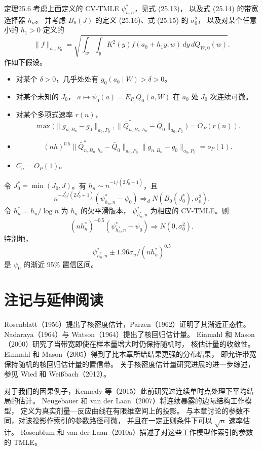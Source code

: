 \begin{bookresult}{定理}{25.6}
考虑上面定义的 CV-TMLE $\psi^*_{h,n}$，见式 (25.13)，
以及式 (25.14) 的带宽选择器 $h_n$。
并考虑 $B_0(J)$ 的定义 (25.16)、式 (25.15) 的 $\sigma_0^2$，
以及对某个任意小的 $h_1>0$ 定义的
\[
 \|f\|_{a_0,P_0}
 =\sqrt{\int_w\int_yK^2(y)f(a_0+h_1y,w)\,dy\,dQ_{W,0}(w)}.
\]
作如下假设。
\begin{itemize}
\item 对某个 $\delta>0$，几乎处处有 $g_0(a_0\mid W)>\delta>0$。
\item 对某个未知的 $J_0$，
$a\mapsto\psi_0(a)=E_{P_0}\bar Q_0(a,W)$
在 $a_0$ 处 $J_0$ 次连续可微。
\item 对某个多项式速率 $r(n)$，
\[
 \max\bigl(\|g_{n,B_n}-g_0\|_{a_0,P_0},
 \|\bar Q^*_{n,B_n,h_n}-\bar Q_0\|_{a_0,P_0}\bigr)=O_P(r(n)).
\]
\item
\[
 (nh)^{0.5}
 \|\bar Q^*_{n,B_n,h_n}-\bar Q_0\|_{a_0,P_0}
 \|g_{n,B_n}-g_0\|_{a_0,P_0}=o_P(1).
\]
\item $C_n=O_P(1)$。
\end{itemize}
令 $J_0^*=\min(J_0,J)$。有
$h_n\sim n^{-1/(2J_0^*+1)}$，且
\[
 n^{-J_0^*/(2J_0^*+1)}
 (\psi^*_{h_n,n}-\psi_0)\Rightarrow_dN(B_0(J_0^*),\sigma_0^2).
\]
令 $h_n^*=h_n/\log n$ 为 $h_n$ 的欠平滑版本，
$\psi^*_{h_n^*,n}$ 为相应的 CV-TMLE。则
\[
 (nh_n^*)^{-0.5}(\psi^*_{h_n^*,n}-\psi_0)
 \Rightarrow N(0,\sigma_0^2).
\]
特别地，
\[
 \psi^*_{h_n^*,n}\pm1.96\sigma_n/(nh_n^*)^{0.5}
\]
是 $\psi_0$ 的渐近 $95\%$ 置信区间。
\end{bookresult}

\section{注记与延伸阅读}

Rosenblatt（1956）提出了核密度估计，Parzen（1962）证明了其渐近正态性。
Nadaraya（1964）与 Watson（1964）提出了核回归估计量。
Einmahl 和 Mason（2000）研究了当带宽即使在样本量增大时仍保持随机时，
核估计量的收敛性。
Einmahl 和 Mason（2005）得到了比本章所给结果更强的分布结果，
即允许带宽保持随机的核回归估计量的置信带。
关于核密度估计量研究进展的进一步综述，参见 Wied 和 Weißbach（2012）。

对于我们的因果例子，Kennedy 等（2015）此前研究过连续单时点处理下平均结局的估计。
Neugebauer 和 van der Laan（2007）将连续暴露的边际结构工作模型，
定义为真实剂量—反应曲线在有限维空间上的投影。
与本章讨论的参数不同，对该投影作索引的参数路径可微，
并且在一定正则条件下可以 $\sqrt n$ 速率估计。
Rosenblum 和 van der Laan（2010a）描述了对这些工作模型作索引的参数的 TMLE。
